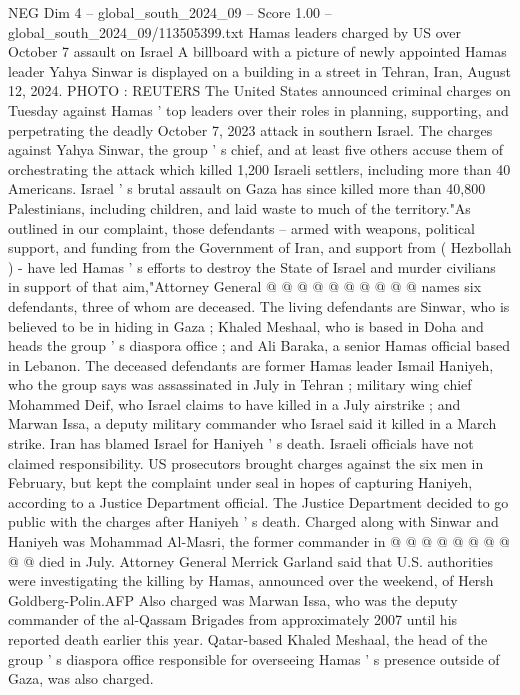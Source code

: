 \begin{textsample}{NEG Dim 4 – global\_south\_2024\_09 – Score 1.00 – global\_south\_2024\_09/113505399.txt}  \label{ex:f4_neg_189}
Hamas leaders charged by US over October 7 assault on Israel A billboard with a picture of newly appointed Hamas leader Yahya Sinwar is displayed on a building in a street in Tehran, Iran, August 12, 2024.
PHOTO : REUTERS The United States announced criminal charges on Tuesday against Hamas ' top leaders over their roles in planning, supporting, and perpetrating the deadly October 7, 2023 attack in southern Israel.
The charges against Yahya Sinwar, the group ' s chief, and at least five others accuse them of orchestrating the attack which killed 1,200 Israeli settlers, including more than 40 Americans.
Israel ' s brutal assault on Gaza has since killed more than 40,800 Palestinians, including children, and laid waste to much of the territory."As outlined in our complaint, those defendants -- armed with weapons, political support, and funding from the Government of Iran, and support from ( Hezbollah ) - have led Hamas ' s efforts to destroy the State of Israel and murder civilians in support of that aim,"Attorney General @ @ @ @ @ @ @ @ @ @ names six defendants, three of whom are deceased.
The living defendants are Sinwar, who is believed to be in hiding in Gaza ; Khaled Meshaal, who is based in Doha and heads the group ' s diaspora office ; and Ali Baraka, a senior Hamas official based in Lebanon.
The deceased defendants are former Hamas leader Ismail Haniyeh, who the group says was assassinated in July in Tehran ; military wing chief Mohammed Deif, who Israel claims to have killed in a July airstrike ; and Marwan Issa, a deputy military commander who Israel said it killed in a March strike.
Iran has blamed Israel for Haniyeh ' s death.
Israeli officials have not claimed responsibility.
US prosecutors brought charges against the six men in February, but kept the complaint under seal in hopes of capturing Haniyeh, according to a Justice Department official.
The Justice Department decided to go public with the charges after Haniyeh ' s death.
Charged along with Sinwar and Haniyeh was Mohammad Al-Masri, the former commander in @ @ @ @ @ @ @ @ @ @ died in July.
Attorney General Merrick Garland said that U.S. authorities were investigating the killing by Hamas, announced over the weekend, of Hersh Goldberg-Polin.AFP Also charged was Marwan Issa, who was the deputy commander of the al-Qassam Brigades from approximately 2007 until his reported death earlier this year.
Qatar-based Khaled Meshaal, the head of the group ' s diaspora office responsible for overseeing Hamas ' s presence outside of Gaza, was also charged.

\end{textsample}
